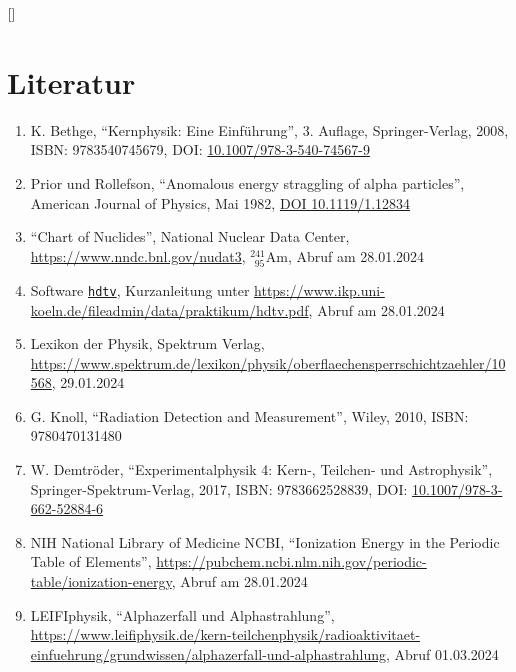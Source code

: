 \documentclass[12pt,a4paper]{scrartcl}
\numberwithin{equation}{section} %
\renewcommand{\[}{} %
\renewcommand{\]}{\noindent} %
\newcommand{\tightlist}{} %
\begin{document}
\(\ref{}\)

\hypertarget{literatur}{%
\section{Literatur}\label{literatur}}

\begin{enumerate}
\def\labelenumi{\arabic{enumi}.}
\tightlist
\item
  K. Bethge, ``Kernphysik: Eine Einführung'', 3. Auflage,
  Springer-Verlag, 2008, ISBN: 9783540745679, DOI:
  \href{https://doi.org/10.1007/978-3-540-74567-9}{10.1007/978-3-540-74567-9}
\item
  Prior und Rollefson, ``Anomalous energy straggling of alpha
  particles'', American Journal of Physics, Mai 1982,
  \href{https://doi.org/10.1119/1.12834}{DOI 10.1119/1.12834}
\item
  ``Chart of Nuclides'', National Nuclear Data Center,
  \url{https://www.nndc.bnl.gov/nudat3}, \(^{241}_{\ \ 95}\mathrm{Am}\),
  Abruf am 28.01.2024
\item
  Software \href{https://pypi.org/project/hdtv}{\texttt{hdtv}},
  Kurzanleitung unter
  \url{https://www.ikp.uni-koeln.de/fileadmin/data/praktikum/hdtv.pdf},
  Abruf am 28.01.2024
\item
  Lexikon der Physik, Spektrum Verlag,
  \url{https://www.spektrum.de/lexikon/physik/oberflaechensperrschichtzaehler/10568},
  29.01.2024
\item
  G. Knoll, ``Radiation Detection and Measurement'', Wiley, 2010, ISBN:
  9780470131480
\item
  W. Demtröder, ``Experimentalphysik 4: Kern-, Teilchen- und
  Astrophysik'', Springer-Spektrum-Verlag, 2017, ISBN: 9783662528839,
  DOI:
  \href{https://doi.org/10.1007/978-3-662-52884-6}{10.1007/978-3-662-52884-6}
\item
  NIH National Library of Medicine NCBI, ``Ionization Energy in the
  Periodic Table of Elements'',
  \url{https://pubchem.ncbi.nlm.nih.gov/periodic-table/ionization-energy},
  Abruf am 28.01.2024
\item
  LEIFIphysik, ``Alphazerfall und Alphastrahlung'',
  \url{https://www.leifiphysik.de/kern-teilchenphysik/radioaktivitaet-einfuehrung/grundwissen/alphazerfall-und-alphastrahlung},
  Abruf 01.03.2024
\end{enumerate}
\end{document}
